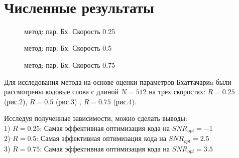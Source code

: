 \documentclass{llncs}
\begin{document}
\\

\section{Численные результаты}
\begin{figure}[!h]
\caption{ метод: пар. Бх. Скорость 0.25}
\end{figure}
\begin{figure}[!h]
\caption{ метод: пар. Бх. Скорость 0.5}
\end{figure}
\begin{figure}[!h]
\caption{метод: пар. Бх. Скорость 0.75}
\label{ris:image}
\end{figure}
Для исследования метода на основе оценки параметров Бхаттачариa были рассмотрены кодовые слова с длиной $ N = 512$ на трех скоростях: $R = 0.25$ (рис.2), $R = 0.5$ (рис.3) , $R = 0.75$ (рис.4). 


Исследуя полученные зависимости, можно сделать выводы:
\\
1) $R=0.25$: Самая эффективная оптимизация кода на $ SNR_{opt} =-1$
\\
2) $R=0.5$:  Самая эффективная оптимизация кода на $ SNR_ {opt} = 2.5$
\\
3) $R=0.75$: Самая эффективная оптимизация кода на $ SNR_{opt} = 3.5$
\end{document}
